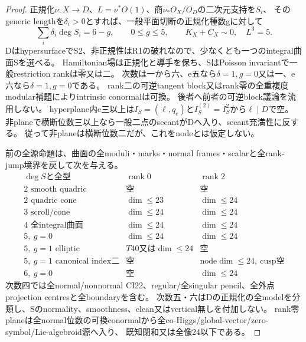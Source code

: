\documentclass[a4paper,11pt]{ltjsarticle}
\theoremstyle{definition}
\newcommand{\rank}{\operatorname{rank}}
\begin{document}
\begin{proof}
正規化$\nu:X\to D$、$L=\nu^*O(1)$、商$\nu_*O_X/O_D$の二次元支持を$S_i$、
そのgeneric lengthを$\delta_i>0$とすれば、一般平面切断の正規化種数gに対して
\[
 \sum_i\delta_i\deg S_i=6-g,\qquad0\le g\le5,\qquad
 K_X+C_X\sim0,\quad L^3=5.
\]
DはhypersurfaceでS2、非正規性はR1の破れなので、少なくとも一つのintegral曲面Sを選べる。
Hamiltonian場は正規化と導手を保ち、SはPoisson invariantで一般restriction rankは零又は二。
次数は一から六、e五なら$\delta=1,g=0$又は一、e六なら$\delta=1,g=0$である。
rank二の可逆tangent block又はrank零の全重複度modular補題によりintrinsic conormalは可換。
後者へ前者の可逆block議論を流用しない。
hyperplane内e三以上は$I_S=(\ell,q_e)$と$I_S^{(2)}=I_S^2$から$\ell\mid D$で空。
非planeで横断位数三以上なら一般二点のsecantがDへ入り、secant充満性に反する。
従って非planeは横断位数二だが、これをnodeとは仮定しない。

前の全源命題は、曲面の全moduli・marks・normal frames・scalarと全rank-jump境界を戻して次を与える。
\[
\begin{array}{c|c|c}
 \deg S\text{と全型}&\rank0&\rank2\\\hline
 2\text{ smooth quadric}&\text{空}&\text{空}\\
 2\text{ quadric cone}&\dim\le23&\dim\le24\\
 3\text{ scroll/cone}&\dim\le24&\dim\le24\\
 4\text{ 全integral曲面}&\dim\le24&\dim\le24\\
 5,\ g=0&\dim\le24&\dim\le24\\
 5,\ g=1\text{ elliptic}&T40\text{又は}\dim\le24&\text{空}\\
 5,\ g=1\text{ canonical index二}&\text{空}&\text{node}\dim\le24,\ \text{cusp空}\\
 6,\ g=0&\text{空}&\dim\le24
\end{array}
\]
次数四では全normal/nonnormal CI22、regular/全singular pencil、全外点projection centresと全boundaryを含む。
次数五・六はDの正規化の全modelを分類し、Sのnormality、smoothness、clean又はvertical無しを付加しない。
rank零planeは全normal位数の可換conormalから全co-Higgs/global-vector/zero-symbol/Lie-algebroid源へ入り、
既知閉和又は全像24以下である。


\end{proof}
\end{document}
